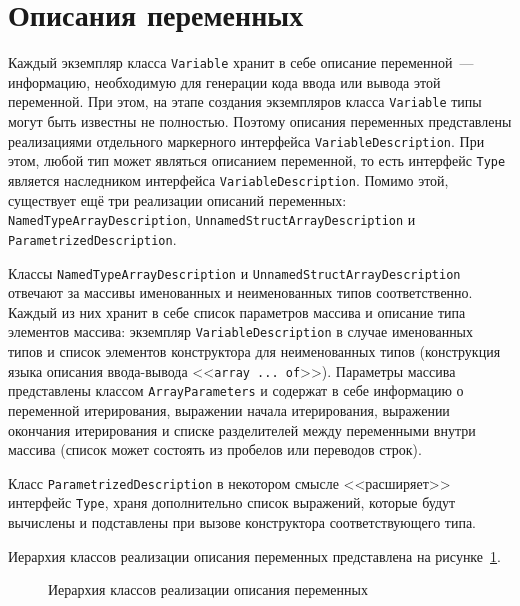 \documentclass[times,specification,annotation]{style/itmo-student-thesis/itmo-student-thesis}
\begin{document}
\section{Описания переменных}

Каждый экземпляр класса \texttt{Variable} хранит в себе описание переменной~--- информацию, необходимую для генерации кода ввода или вывода этой переменной. При этом, на этапе создания экземпляров класса \texttt{Variable} типы могут быть известны не полностью. Поэтому описания переменных представлены реализациями отдельного маркерного интерфейса \texttt{VariableDescription}. При этом, любой тип может являться описанием переменной, то есть интерфейс \texttt{Type} является наследником интерфейса \texttt{VariableDescription}. Помимо этой, существует ещё три реализации описаний переменных: \texttt{NamedTypeArrayDescription}, \texttt{UnnamedStructArrayDescription} и \texttt{ParametrizedDescription}.

Классы \texttt{NamedTypeArrayDescription} и \texttt{UnnamedStructArrayDescription} отвечают за массивы именованных и неименованных типов соответственно. Каждый из них хранит в себе список параметров массива и описание типа элементов массива: экземпляр \texttt{VariableDescription} в случае именованных типов и список элементов конструктора для неименованных типов (конструкция языка описания ввода-вывода <<\texttt{array ... of}>>). Параметры массива представлены классом \texttt{ArrayParameters} и содержат в себе информацию о переменной итерирования, выражении начала итерирования, выражении окончания итерирования и списке разделителей между переменными внутри массива (список может состоять из пробелов или переводов строк).

Класс \texttt{ParametrizedDescription} в некотором смысле <<расширяет>> интерфейс \texttt{Type}, храня дополнительно список выражений, которые будут вычислены и подставлены при вызове конструктора соответствующего типа.

Иерархия классов реализации описания переменных представлена на рисунке~\ref{descriptions-classes-hierarchy}.

\begin{figure}[!h]
\caption{Иерархия классов реализации описания переменных}\label{descriptions-classes-hierarchy}
\centering
{}
\end{figure}
\end{document}
